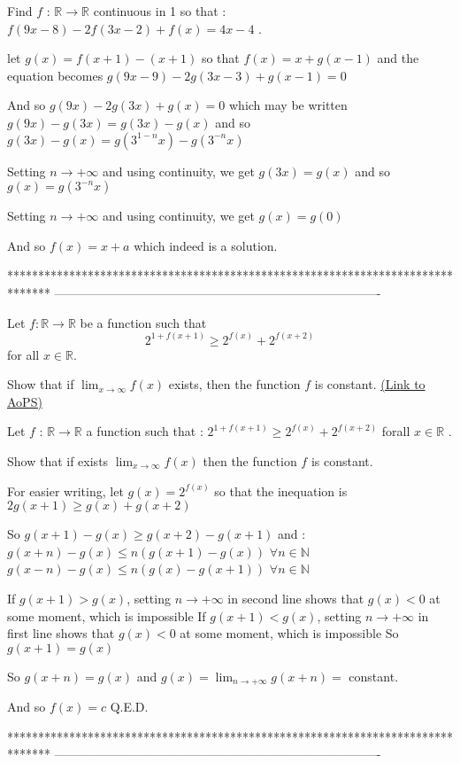 \begin{solution}
	\begin{tcolorbox}Find $f$ : $\mathbb{R}\to\mathbb{R}$ continuous in 1 so that : $f(9x-8)-2f(3x-2)+f(x)=4x-4$ .\end{tcolorbox}
let $g(x)=f(x+1)-(x+1)$ so that $f(x)=x+g(x-1)$ and the equation becomes $g(9x-9)-2g(3x-3)+g(x-1)=0$

And so $g(9x)-2g(3x)+g(x)=0$ which may be written $g(9x)-g(3x)=g(3x)-g(x)$ and so $g(3x)-g(x)=g(3^{1-n}x)-g(3^{-n}x)$

Setting $n\to+\infty$ and using continuity, we get $g(3x)=g(x)$ and so $g(x)=g(3^{-n}x)$

Setting $n\to+\infty$ and using continuity, we get $g(x)=g(0)$

And so $\boxed{f(x)=x+a}$ which indeed is a solution.
\end{solution}
*******************************************************************************
-------------------------------------------------------------------------------

\begin{problem}
	Let $f: \mathbb{R}\to\mathbb{R}$ be a function such that \[2^{1+f(x+1)}\ge 2^{f(x)}+2^{f(x+2)}\] for all $x\in\mathbb{R}$.

Show that if $\lim_{x\to\infty} f(x)$ exists, then the function $f$ is constant.
	\flushright \href{https://artofproblemsolving.com/community/c6h391548}{(Link to AoPS)}
\end{problem}



\begin{solution}
	\begin{tcolorbox}Let $f$ : $\mathbb{R}\to\mathbb{R}$ a function such that : $2^{1+f(x+1)}\ge 2^{f(x)}+2^{f(x+2)}$ forall $x\in\mathbb{R}$ .

Show that if exists $\lim_{x\to\infty} f(x)$ then the function $f$ is constant.\end{tcolorbox}
For easier writing, let $g(x)=2^{f(x)}$ so that the inequation is $2g(x+1)\ge g(x)+g(x+2)$

So $g(x+1)-g(x)\ge g(x+2)-g(x+1)$ and :
$g(x+n)-g(x)\le n(g(x+1)-g(x))$ $\forall n\in\mathbb N$
$g(x-n)-g(x)\le n(g(x)-g(x+1))$ $\forall n\in\mathbb N$

If $g(x+1)>g(x)$, setting $n\to+\infty$ in second line shows that $g(x)<0$ at some moment, which is impossible
If $g(x+1)<g(x)$, setting $n\to+\infty$ in first line shows that $g(x)<0$ at some moment, which is impossible
So $g(x+1)=g(x)$

So $g(x+n)=g(x)$ and $g(x)=\lim_{n\to+\infty}g(x+n)=$ constant.

And so $f(x)=c$
Q.E.D.
\end{solution}
*******************************************************************************
-------------------------------------------------------------------------------

